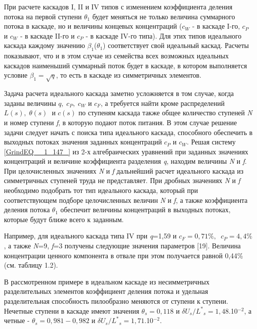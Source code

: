 При расчете каскадов I, II и IV типов с изменением коэффициента деления потока на первой ступени $\theta _{1} $ будет меняться не только величина суммарного потока в каскаде, но и величины концевых концентраций ($c_{W} $ - в каскаде I-го, $c_{P} $ и $c_{W} $ - в каскаде II-го и $c_{P} $ - в каскаде IV-го типа). Для этих типов идеального каскада каждому значению $\beta _{1} $($\theta _{1} $) соответствует свой идеальный каскад. Расчеты показывают, что и в этом случае из семейства всех возможных идеальных каскадов наименьший суммарный поток будет в каскаде, в котором выполняется условие $\beta _{1} =\sqrt{q} $, то есть в каскаде из симметричных элементов.

Задача расчета идеального каскада заметно усложняется в том случае, когда заданы величины $q,\; c_{P} ,\; c_{W} $ и $c_{F} $, а требуется найти кроме распределений $L(s),\; \theta (s)\; $ и $c(s)$ по ступеням каскада также общее количество ступеней \textit{N} и номер ступени\textit{ f}, в которую подают поток питания. В этом случае решение задачи следует начать с поиска типа идеального каскада, способного обеспечить в выходных потоках значения заданных концентраций $c_{P} $ и $c_{W} $. Решая систему \ref{GrindEQ__1_147_} из 2-х алгебраических уравнений при заданных значениях концентраций и величине коэффициента разделения \textit{q}, находим величины \textit{N} и \textit{f}. При целочисленных значениях \textit{N} и \textit{f} дальнейший расчет идеального каскада из симметричных ступеней труда не представляет. При дробных значениях \textit{N} и \textit{f} необходимо подобрать тот тип идеального каскада, который при соответствующем подборе целочисленных величин \textit{N} и \textit{f}, а также коэффициента деления потока $\theta _{1} $ обеспечит величины концентраций в выходных потоках, которые будут ближе всего к заданным. 

Например, для идеального каскада типа IV при \textit{q}=1,59 и $c_{F} =0,71\% ,\; \; c_{P} =4,4\% $, а также \textit{N}=9, \textit{f}=3 получены следующие значения параметров [19]. Величина концентрации ценного компонента в отвале при этом получается равной 0,44\% (см. таблицу 1.2).

В рассмотренном примере в идеальном каскаде из несимметричных разделительных элементов коэффициент деления потока и удельная разделительная способность пилообразно меняются от ступени к ступени. Нечетные ступени в каскаде имеют значения $\theta _{s} =0,118$ и $\delta U_{s} /L^{*} {}_{s} =1,48$$.$10${}^{-2}$, а четные - $\theta _{s} =0,981-0,982$ и $\delta U_{s} /L^{*} {}_{s} =1,71$$.$10${}^{-2}$. 

